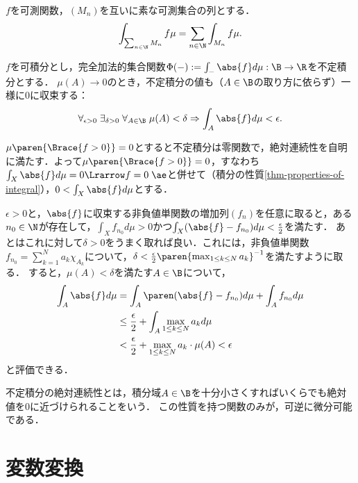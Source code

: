 \documentclass[uplatex, dvipdfmx]{jsreport}
\begin{document}
\begin{theorem}
    $f$を可測関数，$(M_n)$を互いに素な可測集合の列とする．
    \[\int_{\sum_{n\in\N}M_n}f\mu=\sum_{n\in\N}\int_{M_n}f\mu.\]
\end{theorem}

\begin{theorem}[不定積分は絶対連続な加法的集合関数である]\label{thm-indefinite-integral-is-absolutely-continuous}
    $f$を可積分とし，完全加法的集合関数$\Phi(-):=\int_{-}\abs{f}d\mu:\B\to\R$を不定積分とする．
    $\mu(A)\to 0$のとき，不定積分の値も（$A\in\B$の取り方に依らず）一様に$0$に収束する：
    \[\forall_{\epsilon>0}\;\exists_{\delta>0}\;\forall_{A\in\B}\;\mu(A)<\delta\Rightarrow\int_A\abs{f}d\mu<\epsilon.\]
\end{theorem}
\begin{Proof}
    $\mu\paren{\Brace{f>0}}=0$とすると不定積分は零関数で，絶対連続性を自明に満たす．よって$\mu\paren{\Brace{f>0}}=0$，すなわち$\int_X\abs{f}d\mu=0\Lrarrow f=0\;\ae$と併せて（積分の性質\ref{thm-properties-of-integral}），$0<\int_X\abs{f}d\mu$とする．

    $\epsilon>0$と，$\abs{f}$に収束する非負値単関数の増加列$(f_n)$を任意に取ると，ある$n_0\in\N$が存在して，$\int_Xf_{n_0}d\mu>0$かつ$\int_X(\abs{f}-f_{n_0})d\mu<\frac{\epsilon}{2}$を満たす．
    あとはこれに対して$\delta>0$をうまく取れば良い．これには，非負値単関数$f_{n_0}=\sum^N_{k=1}a_k\chi_{A_k}$について，$\delta<\frac{\epsilon}{2}\paren{\max_{1\le k\le N}a_k}^{-1}$を満たすように取る．
    すると，$\mu(A)<\delta$を満たす$A\in\B$について，
    \begin{align*}
        \int_A\abs{f}d\mu&=\int_A\paren(\abs{f}-f_{n_0})d\mu+\int_Af_{n_0}d\mu\\
        &\le\frac{\epsilon}{2}+\int_A\max_{1\le k\le N}a_kd\mu\\
        &<\frac{\epsilon}{2}+\max_{1\le k\le N}a_k\cdot\mu(A)<\epsilon
    \end{align*}
    と評価できる．
\end{Proof}
\begin{remarks}
    不定積分の絶対連続性とは，積分域$A\in\B$を十分小さくすればいくらでも絶対値を$0$に近づけられることをいう．
    この性質を持つ関数のみが，可逆に微分可能である．
\end{remarks}

\section{変数変換}
\end{document}
